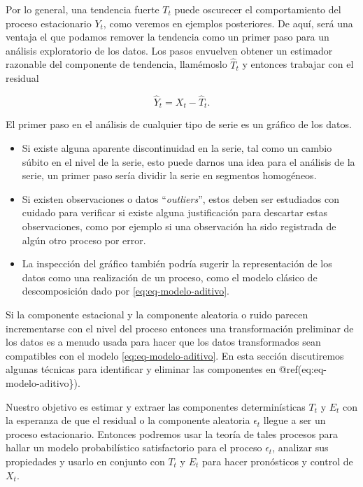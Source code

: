 \documentclass[12pt,]{krantz}
\theoremstyle{definition}
\theoremstyle{definition}
\theoremstyle{definition}
\theoremstyle{remark}
\begin{document}
Por lo general, una tendencia fuerte \(T_t\) puede oscurecer el
comportamiento del proceso estacionario \(Y_t\), como veremos en
ejemplos posteriores. De aquí, será una ventaja el que podamos remover
la tendencia como un primer paso para un análisis exploratorio de los
datos. Los pasos envuelven obtener un estimador razonable del componente
de tendencia, llamémoslo \(\hat{T}_t\) y entonces trabajar con el
residual

\begin{equation}
\hat{Y}_t=X_t-\hat{T}_t.
\label{eq:eq-estimacion-componente-tendencia}
\end{equation}

El primer paso en el análisis de cualquier tipo de serie es un gráfico
de los datos.

\begin{itemize}
\item
  Si existe alguna aparente discontinuidad en la serie, tal como un
  cambio súbito en el nivel de la serie, esto puede darnos una idea para
  el análisis de la serie, un primer paso sería dividir la serie en
  segmentos homogéneos.
\item
  Si existen observaciones o datos ``\emph{outliers}'', estos deben ser
  estudiados con cuidado para verificar si existe alguna justificación
  para descartar estas observaciones, como por ejemplo si una
  observación ha sido registrada de algún otro proceso por error.
\item
  La inspección del gráfico también podría sugerir la representación de
  los datos como una realización de un proceso, como el modelo clásico
  de descomposición dado por \eqref{eq:eq-modelo-aditivo}.
\end{itemize}

Si la componente estacional y la componente aleatoria o ruido parecen
incrementarse con el nivel del proceso entonces una transformación
preliminar de los datos es a menudo usada para hacer que los datos
transformados sean compatibles con el modelo \eqref{eq:eq-modelo-aditivo}.
En esta sección discutiremos algunas técnicas para identificar y
eliminar las componentes en @ref(eq:eq-modelo-aditivo\}).

Nuestro objetivo es estimar y extraer las componentes determinísticas
\(T_t\) y \(E_t\) con la esperanza de que el residual o la componente
aleatoria \(\epsilon_t\) llegue a ser un proceso estacionario. Entonces
podremos usar la teoría de tales procesos para hallar un modelo
probabilístico satisfactorio para el proceso \(\epsilon_t\), analizar
sus propiedades y usarlo en conjunto con \(T_t\) y \(E_t\) para hacer
pronósticos y control de \(X_t\).
\end{document}
